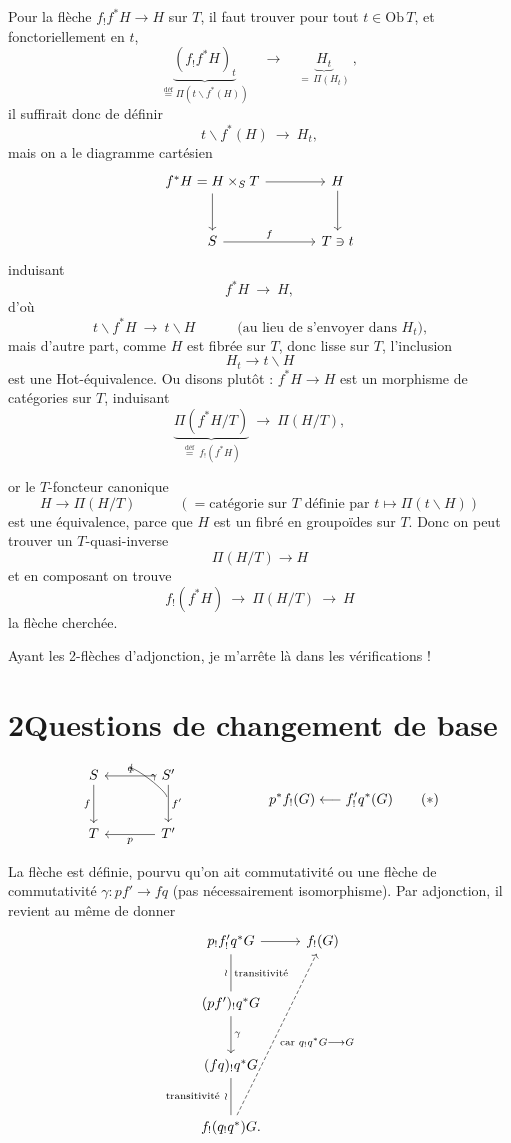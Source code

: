 \documentclass[11pt]{article}
\newcommand{\printedpage}[1]{\marginpar{\footnotesize p.~#1}}
\newcommand{\msp}[1]{\marginpar{\footnotesize [#1]}}
\newcommand{\fl}{\longrightarrow}
\begin{document}
\msp{page 5}
Pour la flèche $f_!f^*H \fl H$ sur $T$, il faut trouver pour tout $t \in \mathrm{Ob}\,T$, et fonctoriellement en $t$,
\[
\underbrace{(f_!f^*H)_t}_{\overset{\text{déf}}{=}\Pi(t\backslash f^*(H))} \quad \fl \quad \underbrace{H_t}_{=\,\Pi(H_t)} \ ,
\]
il suffirait donc de définir
\[
t\backslash f^*(H) \ \fl\ H_t,
\]
mais on a le diagramme cartésien
\[
\begin{tikzcd}[column sep=large, row sep=large]
f^*H = H \times_S T \arrow[r] \arrow[d] & H \arrow[d] \\
S \arrow[r, "f"] & T \ni t
\end{tikzcd}
\]
 induisant
\[
f^*H \ \fl\ H,
\]
\printedpage{5}
d'où
\[
t\backslash f^*H \ \fl\ t\backslash H \qquad\quad \text{(au lieu de s'envoyer dans $H_t$),}
\]
mais d'autre part, comme $H$ est fibrée sur $T$, donc lisse sur $T$, l'inclusion
\[
H_t \fl t\backslash H
\]
est une Hot-équivalence. Ou disons plutôt : $f^*H \fl H$ est un morphisme de catégories sur $T$, induisant
\[
\underbrace{\Pi(f^*H/T)}_{\overset{\text{déf}}{=}\ f_!(f^*H)} \ \fl\ \Pi(H/T),
\]

\msp{page 6}
or le $T$-foncteur canonique
\[
H \fl \Pi(H/T) \qquad\quad (= \text{catégorie sur } T \text{ définie par } t \longmapsto \Pi(t\backslash H))
\]
est une équivalence, parce que $H$ est un fibré en groupoïdes sur $T$. Donc on peut trouver un $T$-quasi-inverse
\[
\Pi(H/T) \fl H
\]
et en composant on trouve
\[
f_!(f^*H) \ \fl\ \Pi(H/T) \ \fl\ H
\]
la flèche cherchée.

Ayant les 2-flèches d'adjonction, je m'arrête là dans les vérifications !

\printedpage{6}

\section*{2\quad Questions de changement de base}

\[
\begin{tikzcd}[column sep=large, row sep=large]
S & S' \arrow[l, "q"'] \arrow[d, "f'"] \\
T \arrow[from=1-1, "f"'] & T' \arrow[l, "p"]
\arrow[from=2-2, to=1-1, bend right=50, shorten <=18pt, shorten >=18pt, "\gamma"']
\end{tikzcd}
\qquad\qquad\qquad
p^*f_!(G) \longleftarrow f'_!q^*(G)
\tag*{$(*)$}
\]

La flèche est définie, pourvu qu'on ait commutativité ou une flèche de commutativité $\gamma : pf' \fl fq$ (pas nécessairement isomorphisme). Par adjonction, il revient au même de donner
\[
\begin{tikzcd}[row sep=large]
p_!f'_!q^*G \arrow[r] \arrow[d, dash, "\wr"', "\text{transitivité}"] & f_!(G) \\
(pf')_!q^*G \arrow[d, "\gamma"] & \\
(fq)_!q^*G \arrow[d, dash, "\text{transitivité}\ \wr"'] & \\
f_!(q_!q^*)G. \arrow[uuur, dashed, "\text{car } q_!q^*G \longrightarrow G"'] &
\end{tikzcd}
\]
\end{document}

